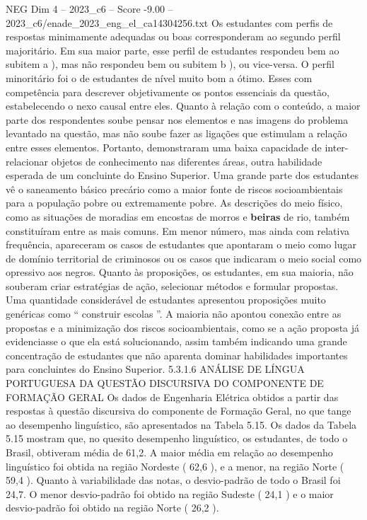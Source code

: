 \begin{textsample}{NEG Dim 4 – 2023\_c6 – Score -9.00 – 2023\_c6/enade\_2023\_eng\_el\_ca14304256.txt}
Os estudantes com perfis de respostas minimamente adequadas ou boas corresponderam ao segundo perfil majoritário.
Em sua maior parte, esse perfil de estudantes respondeu bem ao subitem a ), mas não respondeu bem ou subitem b ), ou vice-versa.
O perfil minoritário foi o de estudantes de nível muito bom a ótimo.
Esses com competência para descrever objetivamente os pontos essenciais da questão, estabelecendo o nexo causal entre eles.
Quanto à relação com o conteúdo, a maior parte dos respondentes soube pensar nos elementos e nas imagens do problema levantado na questão, mas não soube fazer as ligações que estimulam a relação entre esses elementos.
Portanto, demonstraram uma baixa capacidade de inter-relacionar objetos de conhecimento nas diferentes áreas, outra habilidade esperada de um concluinte do Ensino Superior.
Uma grande parte dos estudantes vê o saneamento básico precário como a maior fonte de riscos socioambientais para a população pobre ou extremamente pobre.
As descrições do meio físico, como as situações de moradias em encostas de morros e \textbf{beiras} de rio, também constituíram entre as mais comuns.
Em menor número, mas ainda com relativa frequência, apareceram os casos de estudantes que apontaram o meio como lugar de domínio territorial de criminosos ou os casos que indicaram o meio social como opressivo aos negros.
Quanto às proposições, os estudantes, em sua maioria, não souberam criar estratégias de ação, selecionar métodos e formular propostas.
Uma quantidade considerável de estudantes apresentou proposições muito genéricas como “ construir escolas ”.
A maioria não apontou conexão entre as propostas e a minimização dos riscos socioambientais, como se a ação proposta já evidenciasse o que ela está solucionando, assim também indicando uma grande concentração de estudantes que não aparenta dominar habilidades importantes para concluintes do Ensino Superior. 5.3.1.6 ANÁLISE DE LÍNGUA PORTUGUESA DA QUESTÃO DISCURSIVA DO COMPONENTE DE FORMAÇÃO GERAL Os dados de Engenharia Elétrica obtidos a partir das respostas à questão discursiva do componente de Formação Geral, no que tange ao desempenho linguístico, são apresentados na Tabela 5.15.
Os dados da Tabela 5.15 mostram que, no quesito desempenho linguístico, os estudantes, de todo o Brasil, obtiveram média de 61,2.
A maior média em relação ao desempenho linguístico foi obtida na região Nordeste ( 62,6 ), e a menor, na região Norte ( 59,4 ).
Quanto à variabilidade das notas, o desvio-padrão de todo o Brasil foi 24,7.
O menor desvio-padrão foi obtido na região Sudeste ( 24,1 ) e o maior desvio-padrão foi obtido na região Norte ( 26,2 ).

\end{textsample}
